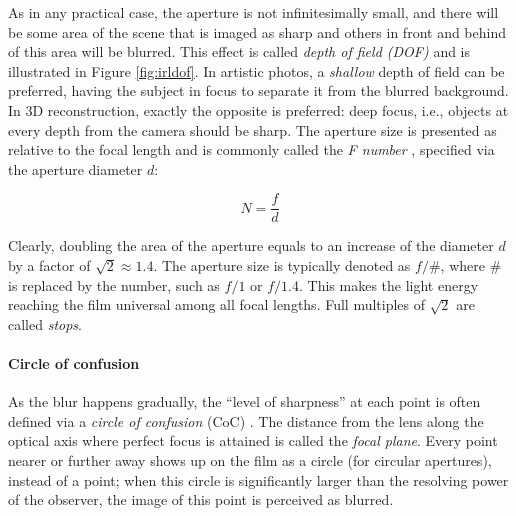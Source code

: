 As in any practical case, the aperture is not infinitesimally small, and there will be some area of the scene that is imaged as sharp and others in front and behind of this area will be blurred.
This effect is called \emph{depth of field (DOF)} and is illustrated in Figure \ref{fig:irldof}.
In artistic photos, a \emph{shallow} depth of field can be preferred, having the subject in focus to separate it from the blurred background.
In 3D reconstruction, exactly the opposite is preferred: deep focus, i.e., objects at every depth from the camera should be sharp.
The aperture size is presented as relative to the focal length and is commonly called the \emph{F number} \cite{szeliski10vision,greenleaf1950photographic}, specified via the aperture diameter $d$:

\begin{equation} \label{eq:fnumber}
	N = \frac{f}{d}
\end{equation}

Clearly, doubling the area of the aperture equals to an increase of the diameter $d$ by a factor of $\sqrt 2 \approx 1.4$.
The aperture size is typically denoted as $f/\#$, where $\#$ is replaced by the number, such as $f/1$ or $f/1.4$.
This makes the light energy reaching the film universal among all focal lengths.
Full multiples of $\sqrt 2$ are called \emph{stops}.
\cite{szeliski10vision}

\paragraph{Circle of confusion}
As the blur happens gradually, the ``level of sharpness'' at each point is often defined via a \emph{circle of confusion} (CoC) \cite{greenleaf1950photographic}.
The distance from the lens along the optical axis where perfect focus is attained is called the \emph{focal plane}.
Every point nearer or further away shows up on the film as a circle (for circular apertures), instead of a point; when this circle is significantly larger than the resolving power of the observer, the image of this point is perceived as blurred.

